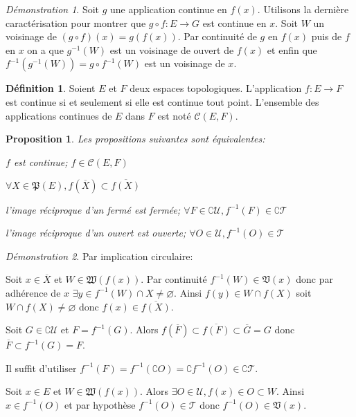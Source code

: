 \documentclass[a4paper, 11pt, french]{book}
\newenvironment{itemise}{\itemize}{\enditemize}
\theoremstyle{plain} %
\newtheorem{proposition}{Proposition}
\theoremstyle{definition} %
\newtheorem{definition}{Définition}
\theoremstyle{remark} %
\newtheorem*{demonstration}{Démonstration}
\newcommand{\1}{\mathds{1}}
\newcommand\vide{\varnothing}
\newcommand{\inv}[1]{#1^{-1}}
\renewcommand{\cal}[1]{\mathcal{#1}}
\renewcommand{\frak}[1]{\mathfrak{#1}}
\newcommand{\scr}[1]{\mathscr{#1}}
\begin{document}
\begin{demonstration}
	Soit $g$ une application continue en $f(x)$.
	Utilisons la dernière caractérisation pour montrer que $g\circ f:E\rightarrow G$ est continue en $x$.
	Soit $W$ un voisinage de $(g\circ f)(x)=g(f(x))$.
	Par continuité de $g$ en $f(x)$ puis de $f$ en $x$ on a que $\inv{g}(W)$ est un voisinage de ouvert de $f(x)$ et enfin que $\inv{f}(\inv{g}(W))=\inv{g\circ f}(W)$ est un voisinage de $x$.
\end{demonstration}

\begin{definition}
	Soient $E$ et $F$ deux espaces topologiques.
	L'application $f\colon E\rightarrow F$ est continue si et seulement si elle est continue tout point.
	L'ensemble des applications continues de $E$ dans $F$ est noté $\mathcal{C}(E, F)$.
\end{definition}

\begin{proposition}
	Les propositions suivantes sont équivalentes:
	\begin{itemise}
		\item $f$ est continue; $f\in\cal{C}(E, F)$
		\item $\forall X\in\frak{P}(E), f(\overline{X})\subset\overline{f(X)}$
		\item l'image réciproque d'un fermé est fermée; $\forall F\in\complement\scr{U}, \inv{f}(F)\in\complement\scr{T}$
		\item l'image réciproque d'un ouvert est ouverte; $\forall O\in\scr{U}, \inv{f}(O)\in\scr{T}$
	\end{itemise}
\end{proposition}

\begin{demonstration}
	Par implication circulaire:
	\begin{itemise}
		\item Soit $x\in\overline{X}$ et $W\in\frak{W}(f(x))$.
		Par continuité $\inv{f}(W)\in\frak{V}(x)$ donc par adhérence de $x$ $\exists y\in\inv{f}(W)\cap X\neq\vide$.
		Ainsi $f(y)\in W\cap f(X)$ soit $W\cap f(X)\neq\vide$ donc $f(x)\in\overline{f(X)}$.
		\item Soit $G\in\complement\scr{U}$ et $F=\inv{f}(G)$.
		Alors $f(\overline{F})\subset\overline{f(F)}\subset\overline{G}=G$ donc $\overline{F}\subset\inv{f}(G)=F$.
		\item Il suffit d'utiliser $\inv{f}(F)=\inv{f}(\complement O)=\complement\inv{f}(O)\in\complement\scr{T}$.
		\item Soit $x\in E$ et $W\in\frak{W}(f(x))$.
		Alors $\exists O\in\scr{U}, f(x)\in O\subset W$.
		Ainsi $x\in\inv{f}(O)$ et par hypothèse $\inv{f}(O)\in\scr{T}$ donc $\inv{f}(O)\in\frak{V}(x)$.
	\end{itemise}
\end{demonstration}
\end{document}
